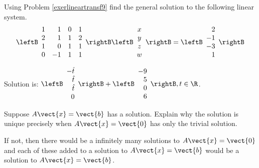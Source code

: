 \begin{enumialphparenastyle}
\begin{ex} Using Problem \ref{exerlineartransf9} find the general solution to the following
linear system.
\begin{equation*}
\leftB
\begin{array}{rrrr}
1 & 1 & 0 & 1 \\
2 & 1 & 1 & 2 \\
1 & 0 & 1 & 1 \\
0 & -1 & 1 & 1
\end{array}
\rightB \leftB
\begin{array}{c}
x \\
y \\
z \\
w
\end{array}
\rightB =\leftB
\begin{array}{r}
2 \\
-1 \\
-3 \\
1
\end{array}
\rightB 
\end{equation*}
\begin{sol}
Solution is: $\leftB
\begin{array}{r}
-\hat{t} \\
\hat{t} \\
\hat{t} \\
0
\end{array}
\rightB +\leftB
\begin{array}{r}
-9 \\
5 \\
0 \\
6
\end{array}
\rightB ,t\in \R$.
\end{sol}
\end{ex}


\begin{ex} Suppose $A\vect{x}=\vect{b}$ has a solution. Explain why the solution is
unique precisely when $A\vect{x}=\vect{0}$ has only the trivial solution.
\vspace{1mm}
\begin{sol}
If not, then there would be a infinitely many solutions to $A\vect{x}=\vect{0}$
and each of these added to a solution to $A\vect{x}=\vect{b}$ would be a solution
to $A\vect{x}=\vect{b}$.
\end{sol}
\end{ex}

\end{enumialphparenastyle}